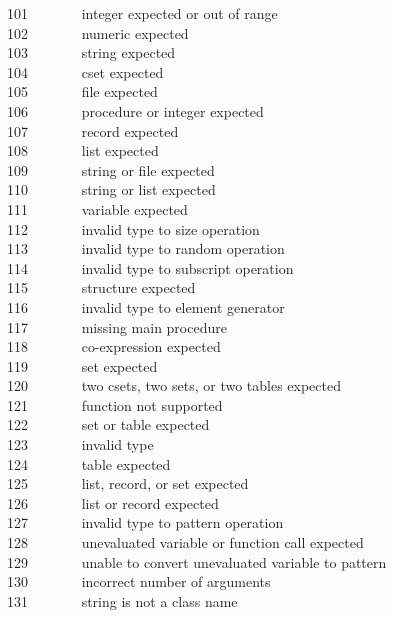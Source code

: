101 \ \ \ \ \ \ \ integer expected or out of range\\
102 \ \ \ \ \ \ \ numeric expected\\
103 \ \ \ \ \ \ \ string expected\\
104 \ \ \ \ \ \ \ cset expected\\
105 \ \ \ \ \ \ \ file expected\\
106 \ \ \ \ \ \ \ procedure or integer expected\\
107 \ \ \ \ \ \ \ record expected\\
108 \ \ \ \ \ \ \ list expected\\
109 \ \ \ \ \ \ \ string or file expected\\
110 \ \ \ \ \ \ \ string or list expected\\
111 \ \ \ \ \ \ \ variable expected\\
112 \ \ \ \ \ \ \ invalid type to size operation\\
113 \ \ \ \ \ \ \ invalid type to random operation\\
114 \ \ \ \ \ \ \ invalid type to subscript operation\\
115 \ \ \ \ \ \ \ structure expected\\
116 \ \ \ \ \ \ \ invalid type to element generator\\
117 \ \ \ \ \ \ \ missing main procedure\\
118 \ \ \ \ \ \ \ co-expression expected\\
119 \ \ \ \ \ \ \ set expected\\
120 \ \ \ \ \ \ \ two csets, two sets, or two tables expected\\
121 \ \ \ \ \ \ \ function not supported\\
122 \ \ \ \ \ \ \ set or table expected\\
123 \ \ \ \ \ \ \ invalid type\\
124 \ \ \ \ \ \ \ table expected\\
125 \ \ \ \ \ \ \ list, record, or set expected\\
126 \ \ \ \ \ \ \ list or record expected\\
127 \ \ \ \ \ \ \ invalid type to pattern operation\\
128 \ \ \ \ \ \ \ unevaluated variable or function call expected\\
129 \ \ \ \ \ \ \ unable to convert unevaluated variable to pattern\\
130 \ \ \ \ \ \ \ incorrect number of arguments\\
131 \ \ \ \ \ \ \ string is not a class name\\
